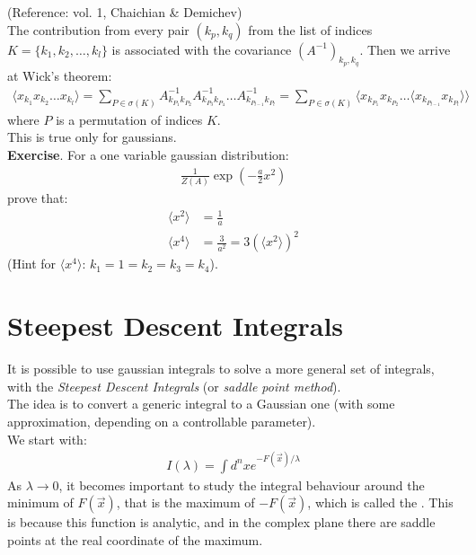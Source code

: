 \documentclass[../template.tex]{subfiles}
\begin{document}
(Reference:  vol. 1, Chaichian \& Demichev)\\

The contribution from every pair $(k_p, k_q)$  from the list of indices $K = \{k_1, k_2, \dots, k_l\}$ is associated with the covariance $(A^{-1})_{k_p, k_q}$. Then we arrive at Wick's theorem:
\begin{align*}
    \langle x_{k_1} x_{k_2 } \dots x_{k_l}  \rangle = \sum_{P \in \sigma(K)} A^{-1}_{k_{P_1} k_{P_2}} A^{-1}_{k_{P_3}k_{P_4}}\dots A^{-1}_{k_{P_{l-1}} k_{P_l}} = \sum_{P \in \sigma(K)} \langle x_{k_{P_1 }} x_{k_{P_2}} \dots \langle x_{k_{P_{l-1}}} x_{k_{P_l}} \rangle \rangle
\end{align*}
where $P$ is a permutation of indices $K$.  \\
This is true only for gaussians.\\


\textbf{Exercise}.
For a one variable gaussian distribution:
\begin{align*}
    \frac{1}{Z(A)} \exp\left(-\frac{a}{2} x^2 \right) 
\end{align*}
prove that:
\begin{align*}
    \langle x^2 \rangle &= \frac{1}{a} \\
    \langle x^4 \rangle &= \frac{3}{a^2} = 3(\langle x^2 \rangle)^2
\end{align*}
(Hint for $\langle x^4 \rangle$: $k_1 = 1 = k_2 = k_3 = k_4$).

\section{Steepest Descent Integrals}
It is possible to use gaussian integrals to solve a more general set of integrals, with the \textit{Steepest Descent Integrals} (or \textit{saddle point method}).\\

The idea is to convert a generic integral to a Gaussian one (with some approximation, depending on a controllable parameter).\\
We start with:
\begin{align*}
    I(\lambda) = \int d^nx e^{-F(\vec{x})/\lambda}
\end{align*}
As $\lambda \to 0$, it becomes important to study the integral behaviour around the minimum of $F(\vec{x})$, that is the maximum of $-F(\vec{x})$, which is called the . This is because this function is analytic, and in the complex plane there are saddle points at the real coordinate of the maximum.\\
\end{document}
